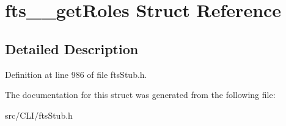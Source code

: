 \section{fts\_\-\_\-getRoles Struct Reference}
\label{structfts____getRoles}


\subsection{Detailed Description}


Definition at line 986 of file ftsStub.h.



The documentation for this struct was generated from the following file:\begin{DoxyCompactItemize}
\item 
src/CLI/ftsStub.h\end{DoxyCompactItemize}
